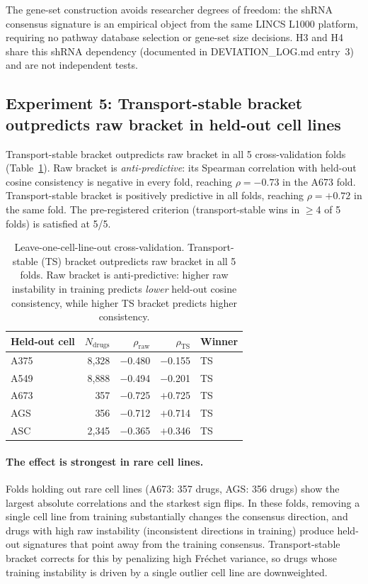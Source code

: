 \documentclass{article}
\begin{document}
The gene-set construction avoids researcher degrees of freedom: the shRNA
consensus signature is an empirical object from the same LINCS L1000
platform, requiring no pathway database selection or gene-set size
decisions. H3 and H4 share this shRNA dependency
(documented in DEVIATION\_LOG.md entry~3) and are not independent tests.

\subsection{Experiment 5: Transport-stable bracket outpredicts raw bracket in held-out cell lines}

Transport-stable bracket outpredicts raw bracket in all 5 cross-validation
folds (Table~\ref{tab:transport}). Raw bracket is \emph{anti-predictive}:
its Spearman correlation with held-out cosine consistency is negative in
every fold, reaching $\rho = -0.73$ in the A673 fold. Transport-stable
bracket is positively predictive in all folds, reaching $\rho = +0.72$ in
the same fold. The pre-registered criterion (transport-stable wins in
$\geq$4 of 5 folds) is satisfied at 5/5.

\begin{table}[t]
\centering
\caption{Leave-one-cell-line-out cross-validation. Transport-stable (TS)
bracket outpredicts raw bracket in all 5 folds. Raw bracket is
anti-predictive: higher raw instability in training predicts \emph{lower}
held-out cosine consistency, while higher TS bracket predicts higher
consistency.}
\label{tab:transport}
\small
\begin{tabular}{lrrrl}
\toprule
Held-out cell & $N_{\text{drugs}}$ & $\rho_{\text{raw}}$ & $\rho_{\text{TS}}$ & Winner \\
\midrule
A375 & 8{,}328 & $-$0.480 & $-$0.155 & TS \\
A549 & 8{,}888 & $-$0.494 & $-$0.201 & TS \\
A673 & 357 & $-$0.725 & $+$0.725 & TS \\
AGS & 356 & $-$0.712 & $+$0.714 & TS \\
ASC & 2{,}345 & $-$0.365 & $+$0.346 & TS \\
\bottomrule
\end{tabular}
\end{table}

\paragraph{The effect is strongest in rare cell lines.}
Folds holding out rare cell lines (A673: 357 drugs, AGS: 356 drugs) show
the largest absolute correlations and the starkest sign flips. In these
folds, removing a single cell line from training substantially changes the
consensus direction, and drugs with high raw instability (inconsistent
directions in training) produce held-out signatures that point away from
the training consensus. Transport-stable bracket corrects for this by
penalizing high Fr\'{e}chet variance, so drugs whose training instability
is driven by a single outlier cell line are downweighted.
\end{document}
